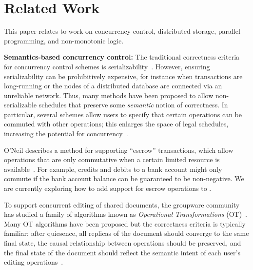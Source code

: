 \section{Related Work}
\label{sec:relwork}

This paper relates to work on concurrency control, distributed storage, parallel
programming, and non-monotonic logic.

\vspace{0.5em}\noindent
\textbf{Semantics-based concurrency control:} The traditional correctness
criteria for concurrency control schemes is
serializability~\cite{Papadimitriou1979}. However, ensuring serializability can
be prohibitively expensive, for instance when transactions are long-running or
the nodes of a distributed database are connected via an unreliable
network. Thus, many methods have been proposed to allow non-serializable
schedules that preserve some \emph{semantic} notion of correctness. In
particular, several schemes allow users to specify that certain operations can
be commuted with other operations; this enlarges the space of legal schedules,
increasing the potential for concurrency~\cite{Farrag1989,Garcia-Molina1983,Weihl1988}.


O'Neil describes a method for supporting ``escrow'' transactions, which allow
operations that are only commutative when a certain limited resource is
available~\cite{O'Neil1986}. For example, credits and debits to a bank account
might only commute if the bank account balance can be guaranteed to be
non-negative. We are currently exploring how to add support for escrow
operations to \lang.


To support concurrent editing of shared documents, the groupware community has
studied a family of algorithms known as \emph{Operational Transformations}
(OT)~\cite{Ellis1989,Sun1998}. Many OT algorithms have been proposed but the
correctness criteria is typically familiar: after quiesence, all replicas of the
document should converge to the same final state, the causal relationship
between operations should be preserved, and the final state of the document
should reflect the semantic intent of each user's editing
operations~\cite{Sun1998a}.

